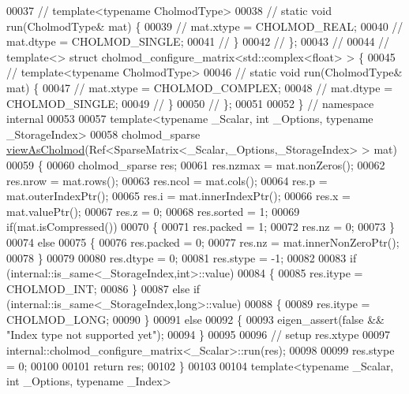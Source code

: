 \begin{DoxyCode}
00037 \textcolor{comment}{//   template<typename CholmodType>}
00038 \textcolor{comment}{//   static void run(CholmodType& mat) \{}
00039 \textcolor{comment}{//     mat.xtype = CHOLMOD\_REAL;}
00040 \textcolor{comment}{//     mat.dtype = CHOLMOD\_SINGLE;}
00041 \textcolor{comment}{//   \}}
00042 \textcolor{comment}{// \};}
00043 \textcolor{comment}{//}
00044 \textcolor{comment}{// template<> struct cholmod\_configure\_matrix<std::complex<float> > \{}
00045 \textcolor{comment}{//   template<typename CholmodType>}
00046 \textcolor{comment}{//   static void run(CholmodType& mat) \{}
00047 \textcolor{comment}{//     mat.xtype = CHOLMOD\_COMPLEX;}
00048 \textcolor{comment}{//     mat.dtype = CHOLMOD\_SINGLE;}
00049 \textcolor{comment}{//   \}}
00050 \textcolor{comment}{// \};}
00051 
00052 \} \textcolor{comment}{// namespace internal}
00053 
00057 \textcolor{keyword}{template}<\textcolor{keyword}{typename} \_Scalar, \textcolor{keywordtype}{int} \_Options, \textcolor{keyword}{typename} \_StorageIndex>
00058 cholmod\_sparse \hyperlink{namespace_eigen_ac9fb9e40cfc9ddbdc7da84ee01bb7545}{viewAsCholmod}(Ref<SparseMatrix<\_Scalar,\_Options,\_StorageIndex> > mat)
00059 \{
00060   cholmod\_sparse res;
00061   res.nzmax   = mat.nonZeros();
00062   res.nrow    = mat.rows();
00063   res.ncol    = mat.cols();
00064   res.p       = mat.outerIndexPtr();
00065   res.i       = mat.innerIndexPtr();
00066   res.x       = mat.valuePtr();
00067   res.z       = 0;
00068   res.sorted  = 1;
00069   \textcolor{keywordflow}{if}(mat.isCompressed())
00070   \{
00071     res.packed  = 1;
00072     res.nz = 0;
00073   \}
00074   \textcolor{keywordflow}{else}
00075   \{
00076     res.packed  = 0;
00077     res.nz = mat.innerNonZeroPtr();
00078   \}
00079 
00080   res.dtype   = 0;
00081   res.stype   = -1;
00082   
00083   \textcolor{keywordflow}{if} (internal::is\_same<\_StorageIndex,int>::value)
00084   \{
00085     res.itype = CHOLMOD\_INT;
00086   \}
00087   \textcolor{keywordflow}{else} \textcolor{keywordflow}{if} (internal::is\_same<\_StorageIndex,long>::value)
00088   \{
00089     res.itype = CHOLMOD\_LONG;
00090   \}
00091   \textcolor{keywordflow}{else}
00092   \{
00093     eigen\_assert(\textcolor{keyword}{false} && \textcolor{stringliteral}{"Index type not supported yet"});
00094   \}
00095 
00096   \textcolor{comment}{// setup res.xtype}
00097   internal::cholmod\_configure\_matrix<\_Scalar>::run(res);
00098   
00099   res.stype = 0;
00100   
00101   \textcolor{keywordflow}{return} res;
00102 \}
00103 
00104 \textcolor{keyword}{template}<\textcolor{keyword}{typename} \_Scalar, \textcolor{keywordtype}{int} \_Options, \textcolor{keyword}{typename} \_Index>

\end{DoxyCode}
